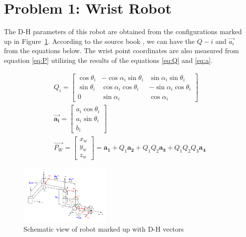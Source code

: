 \documentclass[conference]{IEEEtran}
\begin{document}
\section{Problem 1: Wrist Robot}
The D-H parameters of this robot are obtained from the configurations marked up in Figure~\ref{fig:prob1}. According to the source book \cite{b1}, we can have the \(Q-i\) and \(\vec{a_i}\) from the equations below. The wrist point coordinates are also measured from equation \ref{eq:P} utilizing the results of the equations \ref{eq:Q} and \ref{eq:a}.

\begin{align}
     & Q_i = \begin{bmatrix}
                 \cos \theta_i & - \cos \alpha_i \sin \theta_i & \sin \alpha_i \sin \theta_i   \\
                 \sin \theta_i & \cos \alpha_i \cos \theta_i   & - \sin \alpha_i \cos \theta_i \\
                 0             & \sin \alpha_i                 & \cos \alpha_i
             \end{bmatrix} \label{eq:Q}                                                          \\
     & \vec{\mathbf{a_i}} =
    \begin{bmatrix}
        a_i \cos \theta_i \\
        a_i \sin \theta_i \\
        b_i
    \end{bmatrix} \label{eq:a}                                                                                                                      \\
     & \vec{\mathbf{\mathit{P_W}}} = \begin{bmatrix}
                                         x_w \\
                                         y_w \\
                                         z_w
                                     \end{bmatrix} = \mathbf{a_1} + Q_1 \mathbf{a_2} + Q_1 Q_2 \mathbf{a_3} + Q_1 Q_2 Q_3 \mathbf{a_4} \label{eq:P}
\end{align}

\begin{figure}[htbp]
    \centerline{\includegraphics[width=0.4\textwidth]{figures/prob1.png}}
    \caption{Schematic view of robot marked up with D-H vectors}
    \label{fig:prob1}
\end{figure}
\end{document}
